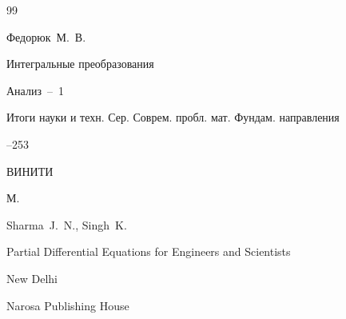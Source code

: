 \begin{thebibliography}{99}








\by Федорюк~М.~В.

\paper Интегральные преобразования

\inbook Анализ~--~1

\serial Итоги науки и техн. Сер. Соврем. пробл. мат. Фундам. направления



--253

\publ ВИНИТИ

\publaddr М.



















\by Sharma~J.~N., Singh~K.

\book Partial Differential Equations for Engineers and Scientists

\publaddr New Delhi

\publ Narosa Publishing House







\end{thebibliography}

